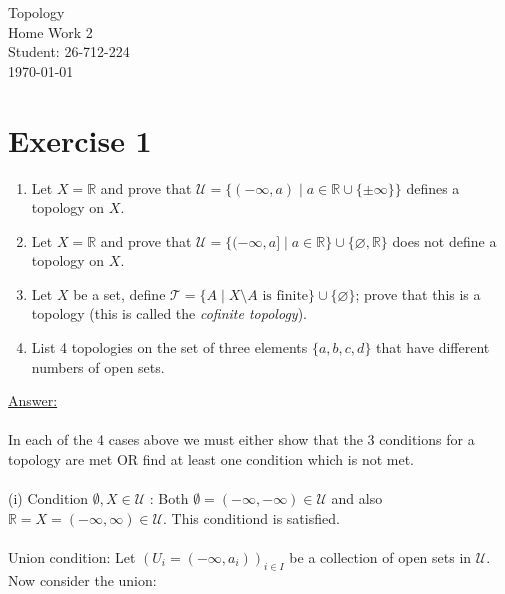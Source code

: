 \documentclass[12pt]{article}
\begin{document}
\begin{titlepage}
\centering
\vspace*{\fill} %
{\Huge Topology} \\[0.5cm] %
{\Huge Home Work 2}\\[1.5cm] %
{\Large Student: 26-712-224}\\[0.5cm] %
{\Large \today} %
\vspace*{\fill}
\end{titlepage}

\newpage
\noindent
\section*{Exercise 1}
\begin{enumerate}
\item[i)] Let \(X=\mathbb{R}\) and prove that
\(\mathcal{U}=\{(-\infty,a)\mid a\in\mathbb{R}\cup\{\pm\infty\}\}\)
defines a topology on \(X\).

\item[ii)] Let \(X=\mathbb{R}\) and prove that
\(\mathcal{U}=\{(-\infty,a]\mid a\in\mathbb{R}\}\cup\{\varnothing,\mathbb{R}\}\)
does not define a topology on \(X\).

\item[iii)] Let \(X\) be a set, define
\(\mathcal{T}=\{A\mid X\setminus A\text{ is finite}\}\cup\{\varnothing\}\);
prove that this is a topology (this is called the
\emph{cofinite topology}).

\item[iv)] List 4 topologies on the set of three elements
\(\{a,b,c,d\}\) that have different numbers of open sets.
\end{enumerate}
\vspace{1cm}
\underline{Answer:}\\
\\
In each of the 4 cases above we must either show that the 3 conditions for a topology are met OR find at least one condition
which is not met.\\
\\
(i) Condition $\emptyset, X \in \mathcal{U}$ : Both $\emptyset = (-\infty, -\infty) \in \mathcal{U}$ and also $\mathbb{R} = X = (-\infty, \infty)  \in \mathcal{U}$. 
This conditiond is satisfied. \\
\\
Union condition: Let $(U_i = (-\infty, a_i))_{i \in I}$ be a collection of open sets in $\mathcal{U}$.  Now consider the union:\\
\end{document}

